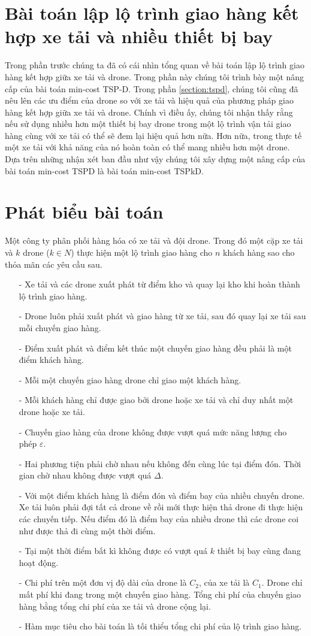 \documentclass[a4paper,12pt]{report}
\begin{document}
\section{Bài toán lập lộ trình giao hàng kết hợp xe tải và nhiều thiết bị bay}
\label{section:intspkd}
Trong phần trước chúng ta đã có cái nhìn tổng quan về bài toán lập lộ trình giao hàng kết hợp giữa xe tải và drone. Trong phần  này chúng tôi trình bày một nâng cấp của bài toán min-cost TSP-D. Trong phần \ref{section:tspd}, chúng tôi cũng đã nêu lên các ưu điểm của drone so với xe tải và hiệu quả của phương pháp giao hàng kết hợp giữa xe tải và drone. Chính vì điều ấy, chúng tôi nhận thấy rằng nếu sử dụng nhiều hơn một thiết bị bay drone trong một lộ trình vận tải giao hàng cùng với xe tải có thể sẽ đem lại hiệu quả hơn nữa. Hơn nữa, trong thực tế một xe tải với khả năng của nó hoàn toàn có thể mang nhiều hơn một drone. Dựa trên những nhận xét ban đầu như vậy chúng tôi xây dựng một nâng cấp của bài toán min-cost TSPD là bài toán min-cost TSPkD.
\section{Phát biểu bài toán}
\label{section:pbtspkd}
Một công ty phân phối hàng hóa có xe tải và đội drone. Trong đó một cặp xe tải và $k$ drone ($k \in N$) thực hiện một lộ trình giao hàng cho $n$ khách hàng sao cho thỏa mãn các yêu cầu sau.
\begin{itemize}
\item[-] Xe tải và các drone xuất phát từ điểm kho và quay lại kho khi hoàn thành lộ trình giao hàng.
\item[-] Drone luôn phải xuất phát và giao hàng từ xe tải, sau đó quay lại xe tải sau mỗi chuyến giao hàng.
\item[-] Điểm xuất phát và điểm kết thúc một chuyến giao hàng đều phải là một điểm khách hàng.
\item[-] Mỗi một chuyến giao hàng drone chỉ giao một khách hàng.
\item[-] Mỗi khách hàng chỉ được giao bởi drone hoặc xe tải và chỉ duy nhất một drone hoặc xe tải.
\item[-] Chuyến giao hàng của drone không được vượt quá mức năng lượng cho phép $\varepsilon$. 
\item[-] Hai phương tiện phải chờ nhau nếu không đến cùng lúc tại điểm đón. Thời gian chờ nhau không được vượt quá $\Delta$.
\item[-] Với một điểm khách hàng là điểm đón và điểm bay của nhiều chuyến drone. Xe tải luôn phải đợi tất cả drone về rồi mới thực hiện thả drone đi thực hiện các chuyến tiếp. Nếu điểm đó là điểm bay của nhiều drone thì các drone coi như được thả đi cùng một thời điểm.
\item[-] Tại một thời điểm bất kì không được có vượt quá $k$ thiết bị bay cùng đang hoạt động.
\item[-] Chi phí trên một đơn vị độ dài của drone là $C_2$, của xe tải là $C_1$. Drone chỉ mất phí khi đang trong một chuyến giao hàng. Tổng chi phí của chuyến giao hàng bằng tổng chi phí của xe tải và drone cộng lại.
\item[-] Hàm mục tiêu cho bài toán là tối thiểu tổng chi phí của lộ trình giao hàng.
\end{itemize}
\end{document}
